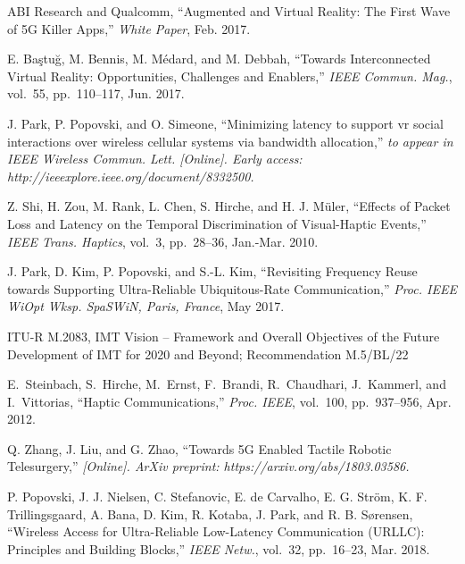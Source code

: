 \documentclass[conference]{IEEEtran}
\begin{document}
\begin{thebibliography}{10}

{ABI Research and Qualcomm}, ``{Augmented and Virtual Reality: The First Wave
  of 5G Killer Apps},'' {\em White Paper}, Feb. 2017.

{E. Ba{\c s}tu{\u g}, M. Bennis, M. M{\'e}dard, and M. Debbah}, ``{Towards
  Interconnected Virtual Reality: Opportunities, Challenges and Enablers},''
  {\em IEEE Commun. Mag.}, vol.~55, pp.~110--117, Jun. 2017.

{J. Park, P. Popovski, and O. Simeone}, ``Minimizing latency to support vr
  social interactions over wireless cellular systems via bandwidth
  allocation,'' {\em to appear in IEEE Wireless Commun. Lett. \emph{[Online]}.
  Early access: http://ieeexplore.ieee.org/document/8332500.}

{Z. Shi, H. Zou, M. Rank, L. Chen, S. Hirche, and H. J. M{\"u}ler}, ``{Effects
  of Packet Loss and Latency on the Temporal Discrimination of Visual-Haptic
  Events},'' {\em IEEE Trans. Haptics}, vol.~3, pp.~28--36, Jan.-Mar. 2010.

{J. Park, D. Kim, P. Popovski, and S.-L. Kim}, ``{Revisiting Frequency Reuse
  towards Supporting Ultra-Reliable Ubiquitous-Rate Communication},'' {\em
  {Proc. IEEE WiOpt Wksp. SpaSWiN, Paris, France}}, May 2017.

{ITU-R M.2083, IMT Vision -- Framework and Overall Objectives of the Future
  Development of IMT for 2020 and Beyond; Recommendation M.5/BL/22}

E.~Steinbach, S.~Hirche, M.~Ernst, F.~Brandi, R.~Chaudhari, J.~Kammerl, and
  I.~Vittorias, ``{Haptic Communications},'' {\em {Proc. IEEE}}, vol.~100,
  pp.~937--956, Apr. 2012.

{Q. Zhang, J. Liu, and G. Zhao}, ``{Towards 5G Enabled Tactile Robotic
  Telesurgery},'' {\em \emph{[Online]}. ArXiv preprint:
  https://arxiv.org/abs/1803.03586.}

{P. Popovski, J. J. Nielsen, C. Stefanovic, E. de Carvalho, E. G. Str\"{o}m, K.
  F. Trillingsgaard, A. Bana, D. Kim, R. Kotaba, J. Park, and R. B.
  S\o{}rensen}, ``{Wireless Access for Ultra-Reliable Low-Latency Communication
  (URLLC): Principles and Building Blocks},'' {\em IEEE Netw.}, vol.~32,
  pp.~16--23, Mar. 2018.


\end{thebibliography}
\end{document}
